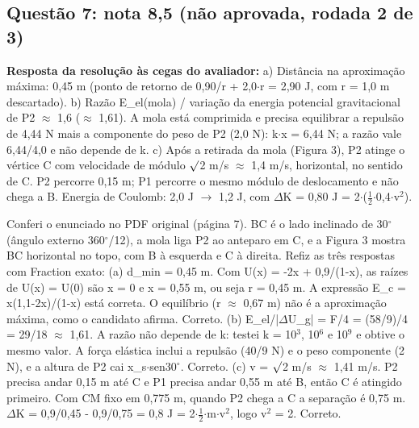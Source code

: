 \documentclass{article}%
\begin{document}
\subsection*{Questão 7: nota 8,5 (não aprovada, rodada 2 de 3)}%
\textbf{Resposta da resolução às cegas do avaliador:} a) Distância na aproximação máxima: 0,45 m (ponto de retorno de 0,90/r + 2,0$\cdot$r = 2,90 J, com r = 1,0 m descartado).\newline%
b) Razão E\_el(mola) / variação da energia potencial gravitacional de P2 $\approx$ 1,6 ($\approx$ 1,61). A mola está comprimida e precisa equilibrar a repulsão de 4,44 N mais a componente do peso de P2 (2,0 N): k$\cdot$x = 6,44 N; a razão vale 6,44/4,0 e não depende de k.\newline%
c) Após a retirada da mola (Figura 3), P2 atinge o vértice C com velocidade de módulo $\surd$2 m/s $\approx$ 1,4 m/s, horizontal, no sentido de C. P2 percorre 0,15 m; P1 percorre o mesmo módulo de deslocamento e não chega a B. Energia de Coulomb: 2,0 J $\to$ 1,2 J, com $\Delta$K = 0,80 J = 2$\cdot$($\frac12$$\cdot$0,4$\cdot$v$^2$).\par %
Conferi o enunciado no PDF original (página 7). BC é o lado inclinado de 30$^\circ$ (ângulo externo 360$^\circ$/12), a mola liga P2 ao anteparo em C, e a Figura 3 mostra BC horizontal no topo, com B à esquerda e C à direita. Refiz as três respostas com Fraction exato:\newline%
\newline%
(a) d\_min = 0,45 m. Com U(x) = -2x + 0,9/(1-x), as raízes de U(x) = U(0) são x = 0 e x = 0,55 m, ou seja r = 0,45 m. A expressão E\_c = x(1,1-2x)/(1-x) está correta. O equilíbrio (r $\approx$ 0,67 m) não é a aproximação máxima, como o candidato afirma. Correto.\newline%
\newline%
(b) E\_el/|$\Delta$U\_g| = F/4 = (58/9)/4 = 29/18 $\approx$ 1,61. A razão não depende de k: testei k = 10$^3$, 10$^{6}$ e 10$^{9}$ e obtive o mesmo valor. A força elástica inclui a repulsão (40/9 N) e o peso componente (2 N), e a altura de P2 cai x\_s$\cdot$sen30$^\circ$. Correto.\newline%
\newline%
(c) v = $\surd$2 m/s $\approx$ 1,41 m/s. P2 precisa andar 0,15 m até C e P1 precisa andar 0,55 m até B, então C é atingido primeiro. Com CM fixo em 0,775 m, quando P2 chega a C a separação é 0,75 m. $\Delta$K = 0,9/0,45 - 0,9/0,75 = 0,8 J = 2$\cdot$$\frac12$$\cdot$m$\cdot$v$^2$, logo v$^2$ = 2. Correto.\newline%
$$
\end{document}
